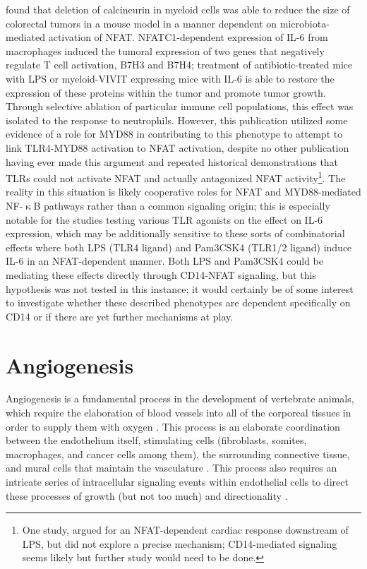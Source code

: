 \citet{Peuker2022} found that deletion of calcineurin in myeloid cells was able to reduce the size of colorectal tumors in a mouse model in a manner dependent on microbiota\hyp{}mediated activation of NFAT. NFATC1\hyp{}dependent expression of IL\hyp{}6 from macrophages induced the tumoral expression of two genes that negatively regulate T cell activation, B7H3 and B7H4; treatment of antibiotic\hyp{}treated mice with LPS or myeloid\hyp{}VIVIT expressing mice with IL\hyp{}6 is able to restore the expression of these proteins within the tumor and promote tumor growth. Through selective ablation of particular immune cell populations, this effect was isolated to the response to neutrophils. However, this publication utilized some evidence of a role for MYD88 in contributing to this phenotype to attempt to link TLR4\hyp{}MYD88 activation to NFAT activation, despite no other publication having ever made this argument and repeated historical demonstrations that TLRs could not activate NFAT and actually antagonized NFAT activity\footnote{One study, \citet{Liu2008a} argued for an NFAT\hyp{}dependent cardiac response downstream of LPS, but did not explore a precise mechanism; CD14\hyp{}mediated signaling seems likely but further study would need to be done.}. The reality in this situation is likely cooperative roles for NFAT and MYD88\hyp{}mediated NF\hyp{}$\upkappa$B pathways rather than a common signaling origin; this is especially notable for the studies testing various TLR agonists on the effect on IL\hyp{}6 expression, which may be additionally sensitive to these sorts of combinatorial effects where both LPS (TLR4 ligand) and Pam3CSK4 (TLR1/2 ligand) induce IL\hyp{}6 in an NFAT\hyp{}dependent manner. Both LPS and Pam3CSK4 could be mediating these effects directly through CD14\hyp{}NFAT signaling, but this hypothesis was not tested in this instance; it would certainly be of some interest to investigate whether these described phenotypes are dependent specifically on CD14 or if there are yet further mechanisms at play. 

\section{Angiogenesis}\label{angiogenesis}

Angiogenesis is a fundamental process in the development of vertebrate animals, which require the elaboration of blood vessels into all of the corporeal tissues in order to supply them with oxygen \citep{Adams2007, Carmeliet2011}. This process is an elaborate coordination between the endothelium itself, stimulating cells (fibroblasts, somites, macrophages, and cancer cells among them), the surrounding connective tissue, and mural cells that maintain the vasculature \citep{Armulik2011, Stratman2017}. This process also requires an intricate series of intracellular signaling events within endothelial cells to direct these processes of growth (but not too much) and directionality \citep{Simons2016}.

